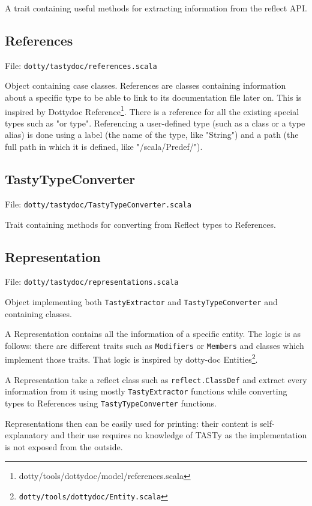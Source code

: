 \documentclass{report}
\begin{document}
A trait containing useful methods for extracting information from the reflect API.

\subsection{References}
File: \texttt{dotty/tastydoc/references.scala}

Object containing case classes. References are classes containing information about a specific type to be able to link to its documentation file later on. This is inspired by Dottydoc Reference\footnote{dotty/tools/dottydoc/model/references.scala}. There is a reference for all the existing special types such as "or type". Referencing a user-defined type (such as a class or a type alias) is done using a label (the name of the type, like "String") and a path (the full path in which it is defined, like "/scala/Predef/").

\subsection{TastyTypeConverter}
File: \texttt{dotty/tastydoc/TastyTypeConverter.scala}

Trait containing methods for converting from Reflect types to References.

\subsection{Representation}
\label{sec:representation}
File: \texttt{dotty/tastydoc/representations.scala}

Object implementing both \texttt{TastyExtractor} and \texttt{TastyTypeConverter} and containing classes.

A Representation contains all the information of a specific entity. The logic is as follows: there are different traits such as \texttt{Modifiers} or \texttt{Members} and classes which implement those traits. That logic is inspired by dotty-doc Entities\footnote{\texttt{dotty/tools/dottydoc/Entity.scala}}.

A Representation take a reflect class such as \texttt{reflect.ClassDef} and extract every information from it using mostly \texttt{TastyExtractor} functions while converting types to References using \texttt{TastyTypeConverter} functions.

Representations then can be easily used for printing: their content is self-explanatory and their use requires no knowledge of TASTy as the implementation is not exposed from the outside.
\end{document}

